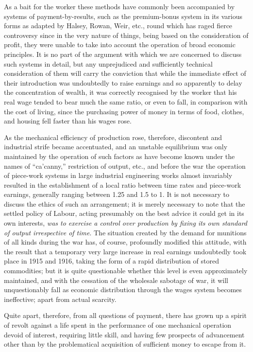 \documentclass{book}
\begin{document}
As a bait for the worker these methods have commonly been accompanied by systems of payment-by-results, such as the premium-bonus system in its various forms as adapted by Halsey, Rowan, Weir, etc., round which has raged fierce controversy since in the very nature of things, being based on the consideration of profit, they were unable to take into account the operation of broad economic principles. It is no part of the argument with which we are concerned to discuss such systems in detail, but any unprejudiced and sufficiently technical consideration of them will carry the conviction that while the immediate effect of their introduction was undoubtedly to raise earnings and so apparently to delay the concentration of wealth, it was correctly recognised by the worker that his real wage tended to bear much the same ratio, or even to fall, in comparison with the cost of living, since the purchasing power of money in terms of food, clothes, and housing fell faster than his wages rose.

As the mechanical efficiency of production rose, therefore, discontent and industrial strife became accentuated, and an unstable equilibrium was only maintained by the operation of such factors as have become known under the names of “ca’canny,” restriction of output, etc., and before the war the operation of piece-work systems in large industrial engineering works almost invariably resulted in the establishment of a local ratio between time rates and piece-work earnings, generally ranging between 1.25 and 1.5 to 1. It is not necessary to discuss the ethics of such an arrangement; it is merely necessary to note that the settled policy of Labour, acting presumably on the best advice it could get in its own interests, \emph{was to exercise a control over production by fixing its own standard of output irrespective of time}. The situation created by the demand for munitions of all kinds during the war has, of course, profoundly modified this attitude, with the result that a temporary very large increase in real earnings undoubtedly took place in 1915 and 1916, taking the form of a rapid distribution of stored commodities; but it is quite questionable whether this level is even approximately maintained, and with the cessation of the wholesale sabotage of war, it will unquestionably fall as economic distribution through the wages system becomes ineffective; apart from actual scarcity.

Quite apart, therefore, from all questions of payment, there has grown up a spirit of revolt against a life spent in the performance of one mechanical operation devoid of interest, requiring little skill, and having few prospects of advancement other than by the problematical acquisition of sufficient money to escape from it.
\end{document}

